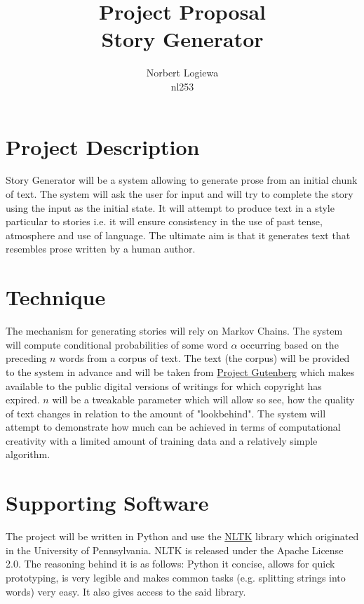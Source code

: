 \documentclass[a4paper, 12pt, notitlepage]{article}
\date{} %
\author{Norbert Logiewa\\nl253}
\title{Project Proposal \\ Story Generator}
\begin{document}
\maketitle

\section*{Project Description}

Story Generator will be a system allowing to generate prose from an initial
chunk of text. The system will ask the user for input and will try to complete
the story using the input as the initial state.  It will attempt to produce
text in a style particular to stories i.e. it will ensure consistency in
the use of past tense, atmosphere and use of language. The ultimate aim is
that it generates text that resembles prose written by a human author.

\section*{Technique}

The mechanism for generating stories will rely on Markov Chains. The system
will compute conditional probabilities of some word $\alpha$ occurring
based on the preceding $n$ words from a corpus of text. The text (the
corpus) will be provided to the system in advance and will be taken from
\href{https://www.gutenberg.org/}{Project Gutenberg} which makes available to
the public digital versions of writings for which copyright has expired. $n$
will be a tweakable parameter which will allow so see, how the quality of text
changes in relation to the amount of "lookbehind". The system will attempt
to demonstrate how much can be achieved in terms of computational creativity
with a limited amount of training data and a relatively simple algorithm.

\section*{Supporting Software}

The project will be written in Python and use the
\href{http://www.nltk.org/}{NLTK} library which originated in the University
of Pennsylvania. NLTK is released under the Apache License 2.0.
The reasoning behind it is as follows: Python it concise, allows for quick
prototyping, is very legible and makes common tasks (e.g. splitting strings
into words) very easy. It also gives access to the said library.
\end{document}
